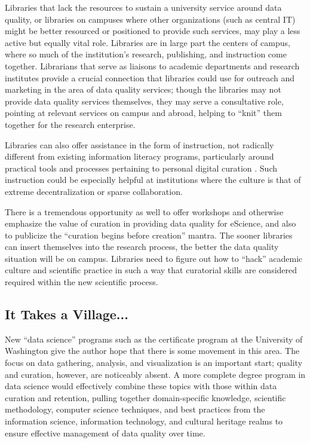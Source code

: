 \documentclass[12pt,letterpaper,titlepage,onecolumn,biblatex,backend=biber,style=chicago-authordate]{article}
\begin{document}
Libraries that lack the resources to sustain a university service
around data quality, or libraries on campuses where other
organizations (such as central IT) might be better resourced or
positioned to provide such services, may play a less active but
equally vital role. Libraries are in large part the centers of campus,
where so much of the institution's research, publishing, and
instruction come together. Librarians that serve as liaisons to
academic departments and research institutes provide a crucial
connection that libraries could use for outreach and marketing in the
area of data quality services; though the libraries may not provide
data quality services themselves, they may serve a consultative role,
pointing at relevant services on campus and abroad, helping to
``knit'' them together for the research enterprise.

Libraries can also offer assistance in the form of instruction, not
radically different from existing information literacy programs,
particularly around practical tools and processes pertaining to
personal digital curation \autocite{williams:lifecycle}. Such instruction
could be especially helpful at institutions where the culture is that
of extreme decentralization or sparse collaboration.

There is a tremendous opportunity as well to offer workshops and
otherwise emphasize the value of curation in providing data quality
for eScience, and also to publicize the ``curation begins before
creation'' mantra. The sooner libraries can insert themselves into the
research process, the better the data quality situation will be on
campus. Libraries need to figure out how to ``hack'' academic culture
and scientific practice in such a way that curatorial skills are
considered required within the new scientific process.

\subsection{It Takes a Village...}

New ``data science'' programs such as the certificate program at the
University of Washington \autocite{uw:datascience} give the author hope
that there is some movement in this area. The focus on data gathering,
analysis, and visualization is an important start; quality and
curation, however, are noticeably absent. A more complete degree
program in data science would effectively combine these topics with
those within data curation and retention, pulling together
domain-specific knowledge, scientific methodology, computer science
techniques, and best practices from the information science,
information technology, and cultural heritage realms to ensure
effective management of data quality over time.
\end{document}
